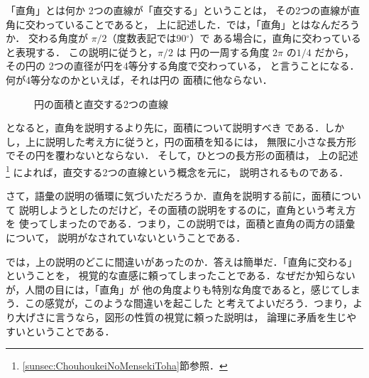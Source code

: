             \begin{memo}{「直角」とは何か}
                2つの直線が「直交する」ということは，
                その2つの直線が直角に交わっていることであると，
                上に記述した．では，「直角」とはなんだろうか．
                交わる角度が $\pi/2$（度数表記では90${}^{\circ}$）で
                ある場合に，直角に交わっていると表現する．
                この説明に従うと，$\pi/2$ は
                円の一周する角度 $2\pi$ の$1/4$ だから，その円の
                2つの直径が円を4等分する角度で交わっている，
                と言うことになる．何が4等分なのかといえば，それは円の
                面積に他ならない．
                    \begin{figure}[hbt]
                        \begin{center}
                            \caption{円の面積と直交する2つの直線}
                            \label{fig:ChokkakuTohaNanika00}
                        \end{center}
                    \end{figure}

                となると，直角を説明するより先に，面積について説明すべき
                である．しかし，上に説明した考え方に従うと，円の面積を知るには，
                無限に小さな長方形でその円を覆わないとならない．
                そして，ひとつの長方形の面積は，
                上の記述
                    \footnote{
                        \ref{sunsec:ChouhoukeiNoMensekiToha}節参照．
                    }
                によれば，直交する2つの直線という概念を元に，
                説明されるものである．

                さて，語彙の説明の循環に気づいただろうか．直角を説明する前に，面積について
                説明しようとしたのだけど，その面積の説明をするのに，直角という考え方を
                使ってしまったのである．つまり，この説明では，面積と直角の両方の語彙について，
                説明がなされていないということである．

                では，上の説明のどこに間違いがあったのか．答えは簡単だ．「直角に交わる」ということを，
                視覚的な直感に頼ってしまったことである．なぜだか知らないが，人間の目には，「直角」が
                他の角度よりも特別な角度であると，感じてしまう．この感覚が，このような間違いを起こした
                と考えてよいだろう．つまり，より大げさに言うなら，図形の性質の視覚に頼った説明は，
                論理に矛盾を生じやすいということである．


\end{memo}
